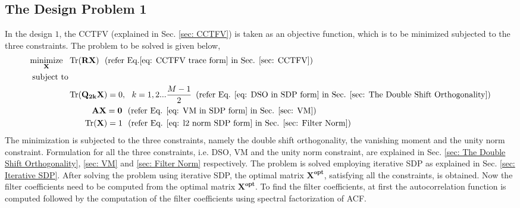 \subsection{The Design Problem 1}
\label{sub: The Design Problem 1}
In the design $1$, the CCTFV (explained in Sec. \ref{sec: CCTFV}) is taken as an objective function, which is to be minimized subjected to the three constraints. The problem to be solved is given below,
\begin{eqnarray}
\begin{aligned}
\underset{\mathbf{X}} {\text{minimize}}\,\,\,\, & \operatorname{Tr}(\mathbf{RX})\,\,\,\,  (\text{refer Eq.\ref{eq: CCTFV trace form} in Sec. \ref{sec: CCTFV}})
\\ \text{subject to} &\\
& \operatorname{Tr}(\mathbf{Q_{2k}X}) = {0}, \,\,\,\, k=1,2...\frac{M-1}{2} \,\,\,(\text{refer Eq. \ref{eq: DSO in SDP form} in Sec. \ref{sec: The Double Shift Orthogonality}})
\\&\,\,\,\,\,\,\,\,\,\,\,\,\,\,\,\,\, \mathbf{AX} = \mathbf{0} \,\,\,\, (\text{refer Eq. \ref{eq: VM in SDP form} in Sec. \ref{sec: VM}}) 
\\&\,\,\,\,\,\,\,\,\,\,\, \operatorname{Tr}(\mathbf{X}) = {1} \,\,\,\, (\text{refer Eq. \ref{eq: l2 norm SDP form} in Sec. \ref{sec: Filter Norm}})
\end{aligned}
\end{eqnarray}
The minimization is subjected to the three constraints, namely the double shift orthogonality, the vanishing moment and the unity norm constraint. Formulation for all the three constraints, i.e. DSO, VM and the unity norm constraint, are explained in Sec. \ref{sec: The Double Shift Orthogonality}, \ref{sec: VM} and \ref{sec: Filter Norm} respectively. The problem is solved employing iterative SDP as explained in Sec. \ref{sec: Iterative SDP}. After solving the problem using iterative SDP, the optimal matrix $\mathbf{X^{opt}}$, satisfying all the constraints, is obtained. Now the filter coefficients need to be computed from the optimal matrix $\mathbf{X^{opt}}$. To find the filter coefficients, at first the autocorrelation function is computed followed by the computation of the filter coefficients using spectral factorization of ACF.


